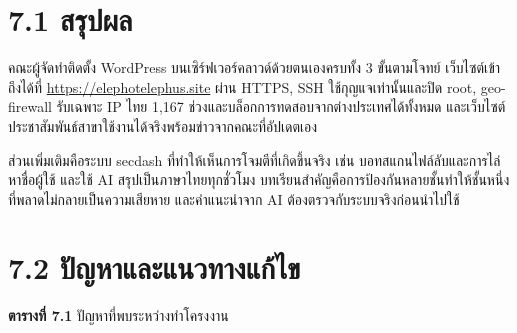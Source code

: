 
\section*{7.1 สรุปผล}

คณะผู้จัดทำติดตั้ง WordPress บนเซิร์ฟเวอร์คลาวด์ด้วยตนเองครบทั้ง 3 ขั้นตามโจทย์ เว็บไซต์เข้าถึงได้ที่ \url{https://elephotelephus.site} ผ่าน HTTPS, SSH ใช้กุญแจเท่านั้นและปิด root, geo-firewall รับเฉพาะ IP ไทย 1,167 ช่วงและบล็อกการทดสอบจากต่างประเทศได้ทั้งหมด และเว็บไซต์ประชาสัมพันธ์สาขาใช้งานได้จริงพร้อมข่าวจากคณะที่อัปเดตเอง

ส่วนเพิ่มเติมคือระบบ secdash ที่ทำให้เห็นการโจมตีที่เกิดขึ้นจริง เช่น บอทสแกนไฟล์ลับและการไล่หาชื่อผู้ใช้ และใช้ AI สรุปเป็นภาษาไทยทุกชั่วโมง บทเรียนสำคัญคือการป้องกันหลายชั้นทำให้ชั้นหนึ่งที่พลาดไม่กลายเป็นความเสียหาย และคำแนะนำจาก AI ต้องตรวจกับระบบจริงก่อนนำไปใช้

\section*{7.2 ปัญหาและแนวทางแก้ไข}

\noindent\textbf{ตารางที่ 7.1} ปัญหาที่พบระหว่างทำโครงงาน

